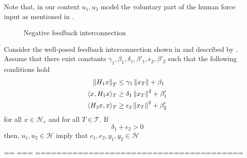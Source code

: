 Note that, in our context $u_1,u_2$ model the voluntary part of the human force input as mentioned in . 


\begin{figure}%
\centering
{}
\caption{Negative feedback interconnection}%
\label{fig:apdx:passint}%
\end{figure}


\begin{thm}Consider the well-posed feedback interconnection shown in  and 
described by . Assume that there exist constants $\gamma_1,\beta_1,
\delta_1,\beta'_1,\epsilon_2,\beta'_2$ such that the following conditions hold
\begin{align}
\displaystyle \left\| H_1x \right\|_T &\leq \gamma_1\displaystyle \left\| x_T \right\|+\beta_1\\
\langle x,H_1x\rangle_T &\geq \delta_1\displaystyle \left\| x_T \right\|^2+\beta'_1\\
\langle H_2x,x\rangle_T &\geq \epsilon_2\displaystyle \left\| x_T \right\|^2+\beta'_2\\
\end{align}
for all $x\in\mathcal{H}_e$ and for all $T\in\mathcal{T}$. If 
\begin{equation}
\delta_1+\epsilon_2 >0
\label{eq:apdx:actpas}
\end{equation}
then, $u_1,u_2 \in \mathcal{H}$ imply that $e_1,e_2,y_1,y_2\in\mathcal{H}$ 
\end{thm}





== === =======================================


